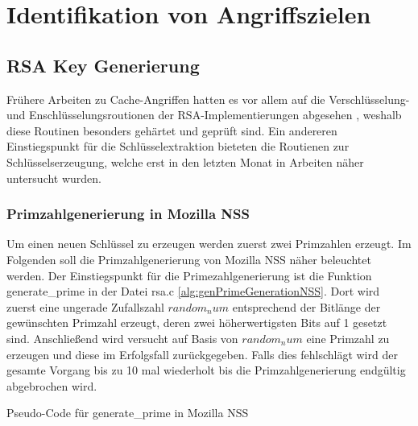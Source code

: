 \chapter{Identifikation von Angriffszielen}
\label{chapter:results}

\section{RSA Key Generierung}

Frühere Arbeiten zu Cache-Angriffen hatten es vor allem auf die Verschlüsselung- und Enschlüsselungsroutionen der RSA-Implementierungen abgesehen \cite{FlushReload, CacheBleedOpenSSLRSA}, weshalb diese Routinen besonders gehärtet und geprüft sind.
Ein andereren Einstiegspunkt für die Schlüsselextraktion bieteten die Routienen zur Schlüsselserzeugung, welche erst in den letzten Monat in Arbeiten näher untersucht wurden.

\subsection{Primzahlgenerierung in Mozilla NSS}

Um einen neuen Schlüssel zu erzeugen werden zuerst zwei Primzahlen erzeugt. Im Folgenden soll die Primzahlgenerierung von Mozilla NSS näher beleuchtet werden.
Der Einstiegspunkt für die Primezahlgenerierung ist die Funktion generate_prime in der Datei rsa.c \ref{alg:genPrimeGenerationNSS}.
Dort wird zuerst eine ungerade Zufallszahl $random_num$ entsprechend der Bitlänge der gewünschten Primzahl erzeugt, deren zwei höherwertigsten Bits auf 1 gesetzt sind.
Anschließend wird versucht auf Basis von $random_num$ eine Primzahl zu erzeugen und diese im Erfolgsfall zurückgegeben.
Falls dies fehlschlägt wird der gesamte Vorgang bis zu 10 mal wiederholt bis die Primzahlgenerierung endgültig abgebrochen wird.

\begin{algorithm}[h]
\DontPrintSemicolon
\caption{Pseudo-Code für generate_prime in Mozilla NSS}
\label{alg:genPrimeGenerationNSS}

\end{algorithm}

